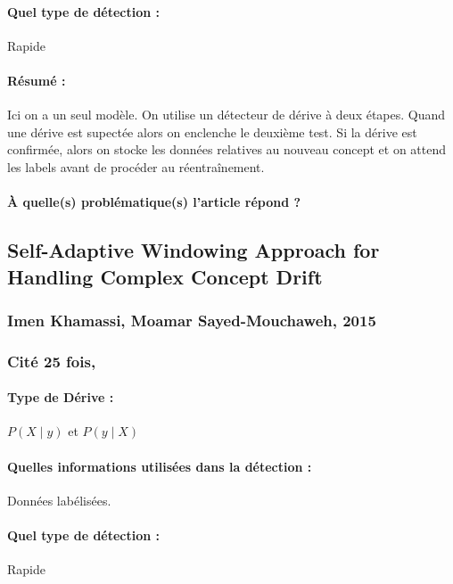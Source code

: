 \documentclass[11pt,a4paper]{report}
\begin{document}
\paragraph{Quel type de détection :} Rapide

\paragraph{Résumé :} Ici on a un seul modèle. On utilise un détecteur de dérive à deux étapes. Quand une dérive est supectée alors on enclenche le deuxième test. Si la dérive est confirmée, alors on stocke les données relatives au nouveau concept et on attend les labels avant de procéder au réentraînement.

\paragraph{À quelle(s) problématique(s) l'article répond ?} 









\subsection{Self-Adaptive Windowing Approach for Handling Complex Concept Drift}
\subsubsection{Imen Khamassi, Moamar Sayed-Mouchaweh,  2015}

\subsubsection{Cité 25 fois, }

\paragraph{Type de Dérive :} $P(X\mid y)$ et $P(y \mid X)$ 
\paragraph{Quelles informations utilisées dans la détection :} Données labélisées.
\paragraph{Quel type de détection :} Rapide
\end{document}
